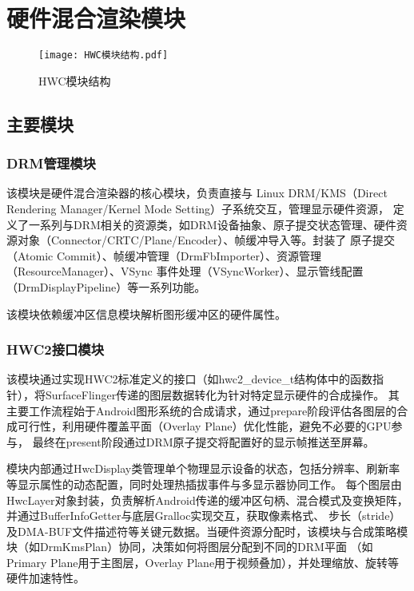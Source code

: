 \section{硬件混合渲染模块}

\begin{figure}[h]
  \centering
  \texttt{[image: HWC模块结构.pdf]}
  \caption{HWC模块结构}
  \label{fig:HWC模块结构}
\end{figure}

\subsection{主要模块}

\subsubsection{DRM管理模块}
该模块是硬件混合渲染器的核心模块，负责直接与 Linux DRM/KMS（Direct Rendering Manager/Kernel Mode Setting）子系统交互，管理显示硬件资源，
定义了一系列与DRM相关的资源类，如DRM设备抽象、原子提交状态管理、硬件资源对象（Connector/CRTC/Plane/Encoder）、帧缓冲导入等。封装了
原子提交（Atomic Commit）、帧缓冲管理（DrmFbImporter）、资源管理（ResourceManager）、VSync 事件处理（VSyncWorker）、显示管线配置（DrmDisplayPipeline）等一系列功能。

该模块依赖缓冲区信息模块解析图形缓冲区的硬件属性。

\subsubsection{HWC2接口模块}
该模块通过实现HWC2标准定义的接口（如hwc2\_device\_t结构体中的函数指针），将SurfaceFlinger传递的图层数据转化为针对特定显示硬件的合成操作。
其主要工作流程始于Android图形系统的合成请求，通过prepare阶段评估各图层的合成可行性，利用硬件覆盖平面（Overlay Plane）优化性能，避免不必要的GPU参与，
最终在present阶段通过DRM原子提交将配置好的显示帧推送至屏幕。

模块内部通过HwcDisplay类管理单个物理显示设备的状态，包括分辨率、刷新率等显示属性的动态配置，同时处理热插拔事件与多显示器协同工作。
每个图层由HwcLayer对象封装，负责解析Android传递的缓冲区句柄、混合模式及变换矩阵，并通过BufferInfoGetter与底层Gralloc实现交互，获取像素格式、
步长（stride）及DMA-BUF文件描述符等关键元数据。当硬件资源分配时，该模块与合成策略模块（如DrmKmsPlan）协同，决策如何将图层分配到不同的DRM平面
（如Primary Plane用于主图层，Overlay Plane用于视频叠加），并处理缩放、旋转等硬件加速特性。


